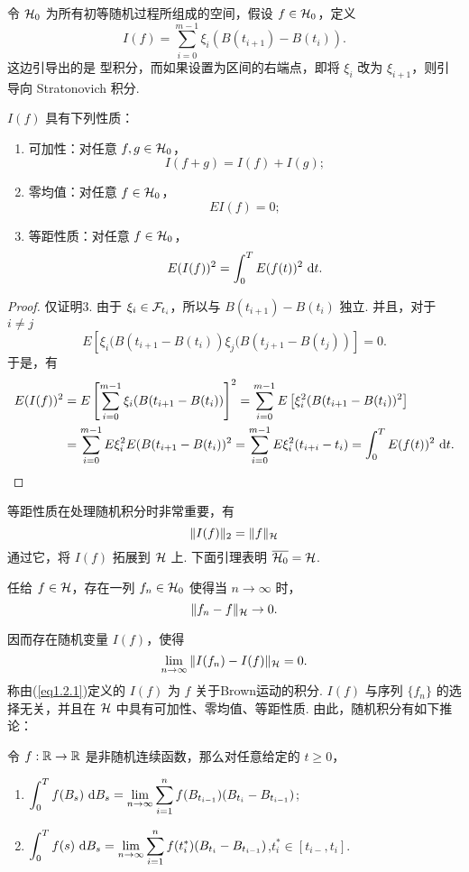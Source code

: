 令 $\mathcal{H}_0$ 为所有初等随机过程所组成的空间，假设 $f \in \mathcal{H}_0$，定义 
\[
I(f) = \sum_{i=0}^{m-1} \xi_i (B(t_{i+1}) - B(t_i)).
\]
这边引导出的是 \ito 型积分，而如果设置为区间的右端点，即将 $\xi_i$ 改为 $\xi_{i+1}$，则引导向 Stratonovich 积分. 

\begin{lemma}
	$I(f)$ 具有下列性质：
	\begin{enumerate}
		\item 可加性：对任意 $f,g \in \mathcal{H}_0$，
			\[ I(f+g)=I(f)+I(g); \]
		\item 零均值：对任意 $f\in \mathcal{H}_0$，
			\[ EI(f) = 0;  \]
		\item 等距性质：对任意 $f\in \mathcal{H}_0$，
			\[ E(I(f))^2 = \int_0^T E(f(t))^2 \text{ d} t. \]
	\end{enumerate}
\end{lemma}
\begin{proof}
	仅证明3. 由于 $\xi_i\in \mathcal{F}_{t_i}$，所以与 $B(t_{i+1}) - B(t_i)$ 独立. 并且，对于 $i \neq j$
	\[
		E[ \xi_i (B(t_{i+1} - B(t_i)) \xi_j (B(t_{j+1} - B(t_j)) ] = 0. 
	\]
	于是，有
	\[
	\begin{aligned}
	E(I(f))^2 &=  E \left[ \sum_{i=0}^{m-1} \xi_i (B(t_{i+1} - B(t_i)) \right] ^2 
		 =\sum_{i=0}^{m-1} E \left[ \xi_i^2 (B(t_{i+1} - B(t_i))^2 \right] \\
		&=\sum_{i=0}^{m-1} E \xi_i^2 E(B(t_{i+1} - B(t_i))^2 
		 =\sum_{i=0}^{m-1} E \xi_i^2 (t_{i+i} - t_i) = \int_0^T E(f(t))^2 \text{ d} t.
	\end{aligned}
	\]
\end{proof}
等距性质在处理随机积分时非常重要，有
\[ \|I(f)\|_2 = \|f\|_{\mathcal{H}} \]
通过它，将 $I(f)$ 拓展到 $\mathcal{H}$ 上. 下面引理表明 $\overline{\mathcal{H}_0} = \mathcal{H}$.
\begin{lemma}
	任给 $f\in \mathcal{H}$，存在一列 $f_n \in \mathcal{H}_0$ 使得当 $n\to \infty$ 时，
	\[ \| f_n-f\|_{\mathcal{H}} \to 0. \]
\end{lemma}
因而存在随机变量 $I(f)$，使得
	\begin{equation} \label{eq1.2.1}
		\lim_{n\to\infty} \|I(f_n) - I(f) \|_{\mathcal{H}} = 0. 
	\end{equation}
称由(\ref{eq1.2.1})定义的 $I(f)$ 为 $f$ 关于Brown运动的积分. $I(f)$ 与序列 $\{f_n\}$ 的选择无关，并且在 $\mathcal{H}$ 中具有可加性、零均值、等距性质. 由此，随机积分有如下推论：
\begin{cor}
	令 $f:\mathbb{R} \to \mathbb{R}$ 是非随机连续函数，那么对任意给定的 $t\ge 0$，
	\begin{enumerate}
		\item $\displaystyle \int_0^T f(B_s) \text{ d} B_s = \lim_{n\to\infty} \sum_{i=1}^n f(B_{t_{i-1}}) (B_{t_i} - B_{t_{i-1}})$;
		\item $\displaystyle \int_0^T f(s) \text{ d} B_s  = \lim_{n\to\infty} \sum_{i=1}^n f(t_i^*) (B_{t_i} - B_{t_{i-1}})$,\quad $t_i^* \in  [ t_{i-},t_i ] $.
	\end{enumerate}
\end{cor}

